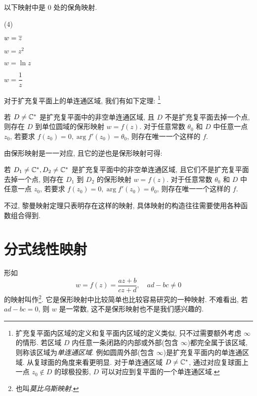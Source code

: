 \begin{exercise}
  以下映射中\fillbrace{}是 $0$ 处的保角映射.
  \begin{exchoice}(4)
    \item $w=\overline z$
    \item $w=z^2$
    \item $w=\ln z$
    \item $w=\dfrac1z$
  \end{exchoice}
\end{exercise}

对于扩充复平面上的单连通区域, 我们有如下定理:
\footnote{
  扩充复平面内区域的定义和复平面内区域的定义类似, 只不过需要额外考虑 $\infty$ 的情形.
  若区域 $D$ 内任意一条闭路的内部或外部(包含 $\infty$)都完全属于该区域, 则称该区域为\emph{单连通区域}.
  例如圆周外部(包含 $\infty$)是扩充复平面内的单连通区域.
  从复球面的角度来看更明显.
  对于单连通区域 $D\neq {\mathbb{C}}^*$, 通过对应复球面上一点 $z_0\notin D$ 的球极投影, $D$ 可以对应到复平面的一个单连通区域.
}

\begin{theorem}[黎曼映射定理]
  \label{thm:riemann-mapping}
  若 $D\neq{\mathbb{C}}^*$ 是扩充复平面中的非空单连通区域, 且 $D$ 不是扩充复平面去掉一个点, 则存在 $D$ 到单位圆域的保形映射 $w=f(z)$.
  对于任意常数 $\theta_0$ 和 $D$ 中任意一点 $z_0$, 若要求 $f(z_0)=0,\arg f'(z_0)=\theta_0$, 则存在唯一一个这样的 $f$.
\end{theorem}

由保形映射是一一对应, 且它的逆也是保形映射可得:
\begin{corollary}
  若 $D_1\neq{\mathbb{C}}^*,D_2\neq{\mathbb{C}}^*$ 是扩充复平面中的非空单连通区域, 且它们不是扩充复平面去掉一个点, 则存在 $D_1$ 到 $D_2$ 的保形映射 $w=f(z)$.
  对于任意常数 $\theta_0$ 和 $D$ 中任意一点 $z_0$, 若要求 $f(z_0)=0,\arg f'(z_0)=\theta_0$, 则存在唯一一个这样的 $f$.
\end{corollary}

不过, 黎曼映射定理只表明存在这样的映射, 具体映射的构造往往需要使用各种函数组合得到.



\section{分式线性映射}

形如
\[
  w=f(z)=\dfrac{az+b}{cz+d},\quad ad-bc\neq 0
\]
的映射叫作\footnote{
  也叫\emph{莫比乌斯映射}.
}.
它是保形映射中比较简单也比较容易研究的一种映射.
不难看出, 若 $ad-bc=0$, 则 $w$ 是一常数, 这不是保形映射也不是我们感兴趣的.

